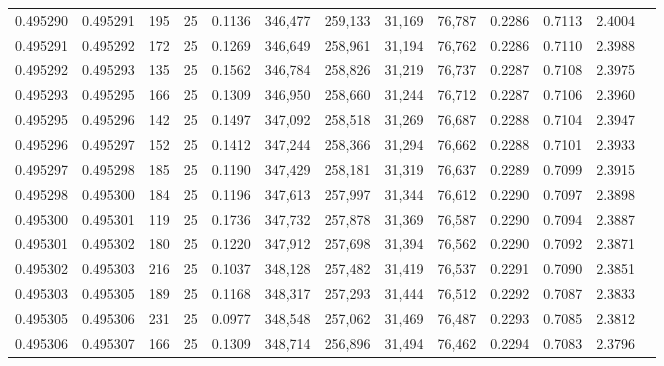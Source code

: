 \begin{tabular}{rrrrrrrrrrrrr}
0.495290 & 0.495291 &   195 &  25 &                                     0.1136 & 346,477 & 259,133 &  31,169 &  76,787 & 0.2286 & 0.7113 & 2.4004 \\
0.495291 & 0.495292 &   172 &  25 &                                     0.1269 & 346,649 & 258,961 &  31,194 &  76,762 & 0.2286 & 0.7110 & 2.3988 \\
0.495292 & 0.495293 &   135 &  25 &                                     0.1562 & 346,784 & 258,826 &  31,219 &  76,737 & 0.2287 & 0.7108 & 2.3975 \\
0.495293 & 0.495295 &   166 &  25 &                                     0.1309 & 346,950 & 258,660 &  31,244 &  76,712 & 0.2287 & 0.7106 & 2.3960 \\
0.495295 & 0.495296 &   142 &  25 &                                     0.1497 & 347,092 & 258,518 &  31,269 &  76,687 & 0.2288 & 0.7104 & 2.3947 \\
0.495296 & 0.495297 &   152 &  25 &                                     0.1412 & 347,244 & 258,366 &  31,294 &  76,662 & 0.2288 & 0.7101 & 2.3933 \\
0.495297 & 0.495298 &   185 &  25 &                                     0.1190 & 347,429 & 258,181 &  31,319 &  76,637 & 0.2289 & 0.7099 & 2.3915 \\
0.495298 & 0.495300 &   184 &  25 &                                     0.1196 & 347,613 & 257,997 &  31,344 &  76,612 & 0.2290 & 0.7097 & 2.3898 \\
0.495300 & 0.495301 &   119 &  25 &                                     0.1736 & 347,732 & 257,878 &  31,369 &  76,587 & 0.2290 & 0.7094 & 2.3887 \\
0.495301 & 0.495302 &   180 &  25 &                                     0.1220 & 347,912 & 257,698 &  31,394 &  76,562 & 0.2290 & 0.7092 & 2.3871 \\
0.495302 & 0.495303 &   216 &  25 &                                     0.1037 & 348,128 & 257,482 &  31,419 &  76,537 & 0.2291 & 0.7090 & 2.3851 \\
0.495303 & 0.495305 &   189 &  25 &                                     0.1168 & 348,317 & 257,293 &  31,444 &  76,512 & 0.2292 & 0.7087 & 2.3833 \\
0.495305 & 0.495306 &   231 &  25 &                                     0.0977 & 348,548 & 257,062 &  31,469 &  76,487 & 0.2293 & 0.7085 & 2.3812 \\
0.495306 & 0.495307 &   166 &  25 &                                     0.1309 & 348,714 & 256,896 &  31,494 &  76,462 & 0.2294 & 0.7083 & 2.3796 \\

\end{tabular}
